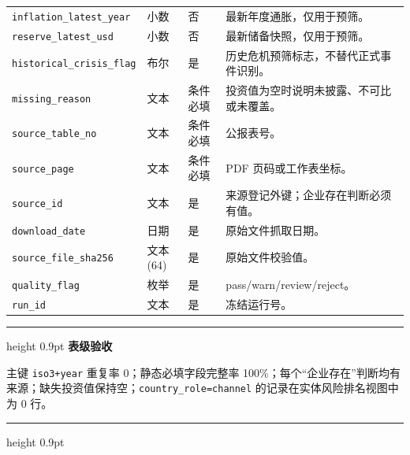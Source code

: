 \documentclass[UTF8,fontset=windows,12pt,openany]{ctexbook}
\newenvironment{gatebox}[1][]{%
  \par\medskip\noindent\begin{center}\begin{minipage}{0.93\textwidth}%
  \color{GoldLine}\hrule height 0.9pt\vspace{0.45em}%
  \textbf{#1}\par\smallskip\color{black}%
}{%
  \par\vspace{0.35em}\color{GoldLine}\hrule height 0.9pt%
  \end{minipage}\end{center}\medskip%
}
\newcommand{\Field}[1]{{\small\nolinkurl{#1}}}
\begin{document}
\begin{longtable}{p{3.5cm}p{2.3cm}p{2.2cm}p{5.3cm}}
\Field{inflation_latest_year} & 小数 & 否 & 最新年度通胀，仅用于预筛。\\
\Field{reserve_latest_usd} & 小数 & 否 & 最新储备快照，仅用于预筛。\\
\Field{historical_crisis_flag} & 布尔 & 是 & 历史危机预筛标志，不替代正式事件识别。\\
\Field{missing_reason} & 文本 & 条件必填 & 投资值为空时说明未披露、不可比或未覆盖。\\
\Field{source_table_no} & 文本 & 条件必填 & 公报表号。\\
\Field{source_page} & 文本 & 条件必填 & PDF 页码或工作表坐标。\\
\Field{source_id} & 文本 & 是 & 来源登记外键；企业存在判断必须有值。\\
\Field{download_date} & 日期 & 是 & 原始文件抓取日期。\\
\Field{source_file_sha256} & 文本(64) & 是 & 原始文件校验值。\\
\Field{quality_flag} & 枚举 & 是 & pass/warn/review/reject。\\
\Field{run_id} & 文本 & 是 & 冻结运行号。\\
\bottomrule
\end{longtable}

\begin{gatebox}[表级验收]
主键 \Field{iso3+year} 重复率 0；静态必填字段完整率 100\%；每个“企业存在”判断均有来源；缺失投资值保持空；\Field{country_role=channel} 的记录在实体风险排名视图中为 0 行。
\end{gatebox}
\end{document}

